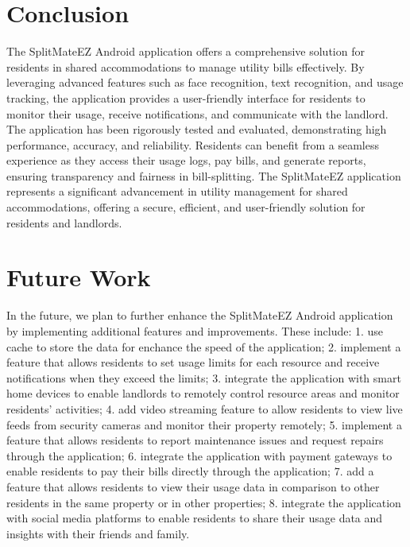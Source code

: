 \documentclass[sigconf]{acmart}
\begin{document}
\section{Conclusion}
The SplitMateEZ Android application offers a comprehensive solution for residents in shared accommodations to manage utility bills effectively. By leveraging advanced features such as face recognition, text recognition, and usage tracking, the application provides a user-friendly interface for residents to monitor their usage, receive notifications, and communicate with the landlord. The application has been rigorously tested and evaluated, demonstrating high performance, accuracy, and reliability. Residents can benefit from a seamless experience as they access their usage logs, pay bills, and generate reports, ensuring transparency and fairness in bill-splitting. The SplitMateEZ application represents a significant advancement in utility management for shared accommodations, offering a secure, efficient, and user-friendly solution for residents and landlords.

\section{Future Work}
In the future, we plan to further enhance the SplitMateEZ Android application by implementing additional features and improvements. These include: 1. use cache to store the data for enchance the speed of the application; 2. implement a feature that allows residents to set usage limits for each resource and receive notifications when they exceed the limits; 3. integrate the application with smart home devices to enable landlords to remotely control resource areas and monitor residents' activities; 4. add video streaming feature to allow residents to view live feeds from security cameras and monitor their property remotely; 5. implement a feature that allows residents to report maintenance issues and request repairs through the application; 6. integrate the application with payment gateways to enable residents to pay their bills directly through the application; 7. add a feature that allows residents to view their usage data in comparison to other residents in the same property or in other properties; 8. integrate the application with social media platforms to enable residents to share their usage data and insights with their friends and family.


\newpage


\end{document}
